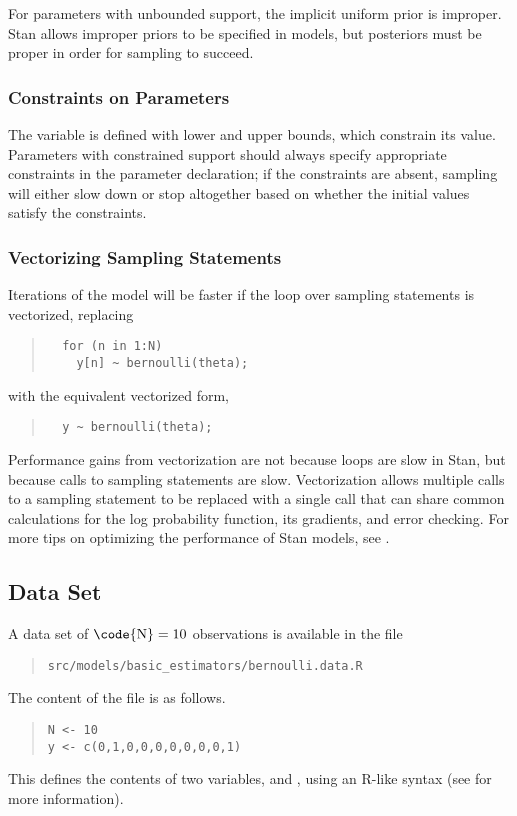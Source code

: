 For parameters with unbounded support, the implicit uniform prior is
improper.  Stan allows improper priors to be specified in models, but
posteriors must be proper in order for sampling to succeed.


\subsubsection{Constraints on Parameters}

The variable  is defined with lower and upper bounds,
which constrain its value.  Parameters with constrained support should
always specify appropriate constraints in the parameter declaration;
if the constraints are absent, sampling will either slow down or stop
altogether based on whether the initial values satisfy the constraints.

\subsubsection{Vectorizing Sampling Statements}

Iterations of the model will be faster if the loop over sampling
statements is vectorized, replacing
%
\begin{quote}
\begin{Verbatim}
  for (n in 1:N) 
    y[n] ~ bernoulli(theta);
\end{Verbatim}
\end{quote}
%
with the equivalent vectorized form,
%
\begin{quote}
\begin{Verbatim}
  y ~ bernoulli(theta);
\end{Verbatim}
\end{quote}
%
Performance gains from vectorization are not because loops are slow in
Stan, but because calls to sampling statements are slow.
Vectorization allows multiple calls to a sampling statement to be
replaced with a single call that can share common calculations for the
log probability function, its gradients, and error checking.  For more
tips on optimizing the performance of Stan models, see
.


\subsection{Data Set}

A data set of $\mbox{\code{N}}=10$ observations is available in the file
%
\begin{quote}
\nolinkurl{src/models/basic_estimators/bernoulli.data.R}
\end{quote}
%
The content of the file is as follows.
%
\begin{quote}
\begin{Verbatim}
N <- 10
y <- c(0,1,0,0,0,0,0,0,0,1)
\end{Verbatim}
\end{quote}
%
This defines the contents of two variables,  and ,
using an R-like syntax (see  for more information).




